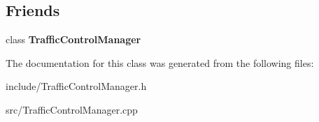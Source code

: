 \subsection*{Friends}
\begin{DoxyCompactItemize}
\item 
\mbox{\label{classecodtn_1_1net_1_1SubNetworkInterface_adeeed37e1728cf122ba6e8c3071fad16}} 
class {\bfseries Traffic\+Control\+Manager}
\end{DoxyCompactItemize}


The documentation for this class was generated from the following files\+:\begin{DoxyCompactItemize}
\item 
include/Traffic\+Control\+Manager.\+h\item 
src/Traffic\+Control\+Manager.\+cpp\end{DoxyCompactItemize}
